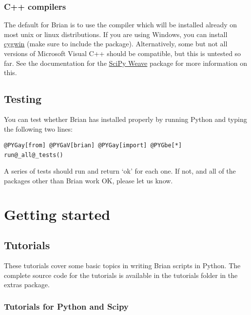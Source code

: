 \documentclass[letterpaper,10pt,english]{manual}
\begin{document}
\subsection{C++ compilers}

The default for Brian is to use the  compiler which will
be installed already on most unix or linux distributions. If you are using Windows, you can
install \href{http://www.cygwin.com/}{cygwin} (make sure to include the  package). Alternatively,
some but not all versions of Microsoft Visual C++ should be compatible, but this is untested
so far. See the documentation for the \href{http://www.scipy.org/Weave}{SciPy Weave} package for
more information on this.


\section{Testing}

You can test whether Brian has installed properly by running Python and typing
the following two lines:

\begin{Verbatim}[commandchars=@\[\]]
@PYGay[from] @PYGaV[brian] @PYGay[import] @PYGbe[*]
run@_all@_tests()
\end{Verbatim}

A series of tests should run and return `ok' for each one. If not, and all of the packages other than
Brian work OK, please let us know.

\resetcurrentobjects


\chapter{Getting started}

\resetcurrentobjects


\section{Tutorials}

These tutorials cover some basic topics in writing Brian scripts in Python. The
complete source code for the tutorials is available in the tutorials folder
in the extras package.

\resetcurrentobjects


\subsection{Tutorials for Python and Scipy}
\end{document}
